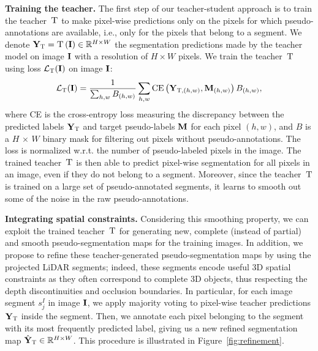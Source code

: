\documentclass[runningheads]{llncs}
\newcommand{\teacher}{\textsc{T}} \newcommand{\student}{\textsc{S}} \newcommand{\das}{D\&S\xspace}
\newcommand{\paragraphcustom}[1]{\smallskip\noindent\textbf{#1}}
\begin{document}
\paragraphcustom{Training the teacher.} The first step of our teacher-student approach is to train the teacher~$\teacher $ to make pixel-wise predictions only on the pixels for which pseudo-annotations are available, i.e., only for the pixels that belong to a segment. We denote $\vY_{\teacher } = \teacher \left( \vI \right) \in \real^{H\times W}$ the segmentation predictions made by the teacher model on image $\mathbf{I}$ with a resolution of $H\times W$ pixels. We train the teacher~$\teacher $ using loss $\mathcal{L}_\teacher (\vI) $ on image $\mathbf{I}$:  
\begin{equation}
     \mathcal{L}_\teacher (\vI) = \frac{1}{\sum\nolimits_{h,w}{B_{(h,w)}}} 
     \sum_{h,w}
     \mathrm{CE}\left( \vY_{\teacher,(h,w) }, \vM_{(h,w)} \right) B_{(h,w)},
     \label{eq:disti}
\end{equation}
where CE is the cross-entropy loss measuring the discrepancy between the predicted labels $\vY_{\teacher}$ and target pseudo-labels $\mathbf{M}$ for each pixel $(h,w)$, 
and $B$ is a $H\,{\times}\,W$ binary mask for filtering out pixels without pseudo-annotations. The loss is normalized w.r.t. the number of pseudo-labeled pixels in the image.
The trained teacher~$\teacher $ is then able to predict pixel-wise segmentation for all pixels in an image, even if they do not belong to a segment. Moreover, since the teacher~$\teacher $ is trained on a large set of pseudo-annotated segments, it learns to smooth out some of the noise in the raw pseudo-annotations.

\paragraphcustom{Integrating spatial constraints.} Considering this smoothing property, we can exploit the trained teacher~$\teacher$ for generating new, complete (instead of partial) and smooth pseudo-segmentation maps for the training images. In addition, we propose to refine these teacher-generated pseudo-segmentation maps by using the projected LiDAR segments; indeed, these segments encode useful 3D spatial constraints as they often correspond to complete 3D objects, thus respecting the depth discontinuities and occlusion boundaries. In particular, for each image segment $s^I_{j}$ in image $\mathbf{I}$, we apply majority voting to pixel-wise teacher predictions $\mathrm{\vY}_{\teacher }$ inside the segment. Then, we annotate each pixel belonging to the segment with its most frequently predicted label, giving us a new refined segmentation map $\mathrm{\hat{\vY}}_{\teacher } \in \real^{H\times W}$. This procedure is illustrated in Figure~\ref{fig:refinement}.
\end{document}
